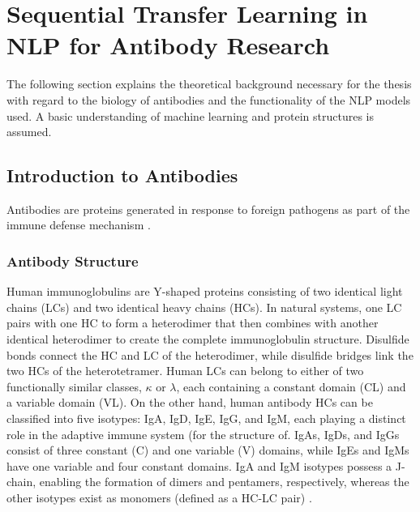 \chapter{Sequential Transfer Learning in NLP for Antibody Research} \label{theorie}


The following section explains the theoretical background necessary for the thesis with regard to the biology of antibodies and the functionality of the NLP models used. A basic understanding of machine learning and protein structures is assumed.

\section{Introduction to Antibodies}

Antibodies are proteins generated in response to foreign pathogens as part of the immune defense mechanism \citep{Graves2020}.

\subsection{Antibody Structure}

Human immunoglobulins are Y-shaped proteins consisting of two identical light chains (LCs) and two identical heavy chains (HCs). In natural systems, one LC pairs with one HC to form a heterodimer that then combines with another identical heterodimer to create the complete immunoglobulin structure. Disulfide bonds connect the HC and LC of the heterodimer, while disulfide bridges link the two HCs of the heterotetramer. Human LCs can belong to either of two functionally similar classes, $\kappa$ or $\lambda$, each containing a constant domain (CL) and a variable domain (VL). On the other hand, human antibody HCs can be classified into five isotypes: IgA, IgD, IgE, IgG, and IgM, each playing a distinct role in the adaptive immune system (for the structure of. IgAs, IgDs, and IgGs consist of three constant (C) and one variable (V) domains, while IgEs and IgMs have one variable and four constant domains. IgA and IgM isotypes possess a J-chain, enabling the formation of dimers and pentamers, respectively, whereas the other isotypes exist as monomers (defined as a HC-LC pair) \citep{Chiu2019}.

